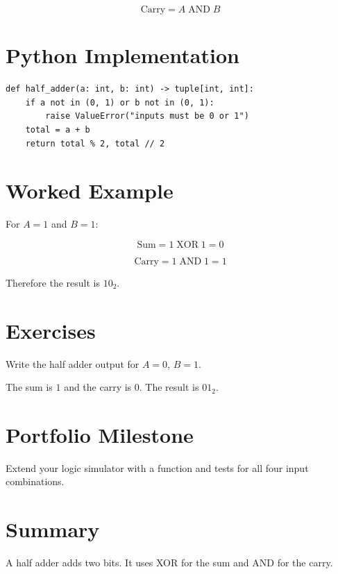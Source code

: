 \[
\text{Carry}=A\operatorname{AND}B
\]

\section{Python Implementation}

\begin{lstlisting}
def half_adder(a: int, b: int) -> tuple[int, int]:
    if a not in (0, 1) or b not in (0, 1):
        raise ValueError("inputs must be 0 or 1")
    total = a + b
    return total % 2, total // 2
\end{lstlisting}

\section{Worked Example}

For \(A=1\) and \(B=1\):

\[
\text{Sum}=1\operatorname{XOR}1=0
\]

\[
\text{Carry}=1\operatorname{AND}1=1
\]

Therefore the result is \(10_2\).

\section{Exercises}

\begin{exercise}
Write the half adder output for \(A=0\), \(B=1\).
\end{exercise}

\begin{solution}
The sum is \(1\) and the carry is \(0\). The result is \(01_2\).
\end{solution}

\section{Portfolio Milestone}

Extend your logic simulator with a  function and tests for all four input combinations.

\section{Summary}

A half adder adds two bits. It uses XOR for the sum and AND for the carry.
